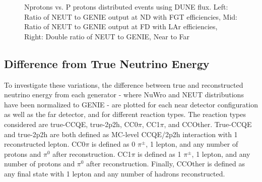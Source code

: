 \documentclass[12pt]{article}
\begin{document}
\begin{figure}[h]
\endminipage
\caption{Nprotons vs. P protons distributed events using DUNE flux. Left: Ratio of NEUT to GENIE output at ND with FGT efficiencies, Mid: Ratio of NEUT to GENIE output at FD with LAr efficiencies, Right: Double ratio of NEUT to GENIE, Near to Far}
\end{figure}
\FloatBarrier

\subsection{Difference from True Neutrino Energy}
\label{subsec:EDiff}
To investigate these variations, the difference between true and reconstructed neutrino energy from each generator - where NuWro and NEUT distributions have been normalized to GENIE - are plotted for each near detector configuration as well as the far detector, and for different reaction types. The reaction types considered are true-CCQE, true-2p2h, CC0$\pi$, CC1$\pi$, and CCOther. True-CCQE and true-2p2h are both defined as MC-level CCQE/2p2h interaction with 1 reconstructed lepton. CC0$\pi$ is defined as 0 $\pi^{\pm}$, 1 lepton, and any number of protons and $\pi^0$ after reconstruction. CC1$\pi$ is defined as 1 $\pi^{\pm}$, 1 lepton, and any number of protons and $\pi^0$ after reconstruction. Finally, CCOther is defined as any final state with 1 lepton and any number of hadrons reconstructed.
\end{document}
